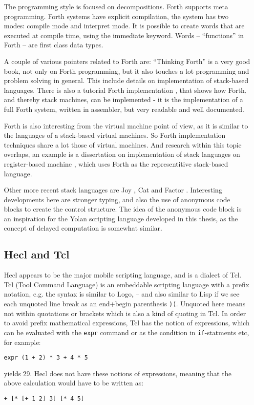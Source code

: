 \documentclass[11pt]{report}
\begin{document}
The programming style is focused on decompositions. Forth supports meta programming.
Forth systems have explicit compilation, the system has two modes: compile mode and interpret mode. 
It is possible to create words that are executed at compile time, using the immediate keyword.
Words -- ``functions'' in Forth -- are first class data types.

A couple of various pointers related to Forth are: 
``Thinking Forth'' is a very good book, not only on Forth programming, but it also touches a lot programming and problem solving in general. This include details on implementation of stack-based languages.
There is also a tutorial Forth implementation \cite{jonesforth}, that shows how Forth, and thereby stack machines, can be implemented - it is the implementation of a full Forth system, written in assembler, but very readable and well documented.

Forth is also interesting from the virtual machine point of view, as it is similar to the languages of a stack-based virtual machines. So Forth implementation techniques share a lot those of virtual machines. And research within this topic overlaps, an example is a dissertation on implementation of stack languages on register-based machine \cite{ertl-dissertation}, which uses Forth as the representitive stack-based language.

Other more recent stack languages are Joy \cite{joy-language}, Cat \cite{cat-language} and Factor \cite{factor-language}.
Interesting developments here are stronger typing, and also the use of anonymous code blocks to create the control structure.
The idea of the anonymous code block is an inspiration for the Yolan scripting language developed in this thesis, as the concept of delayed computation is somewhat similar.


\subsection{Hecl and Tcl}
Hecl appears to be the major mobile scripting language, and is a dialect of Tcl. 
Tcl (Tool Command Language) is an embeddable scripting language \cite{tclbook} with a prefix notation, e.g. the syntax is similar to Logo, -- and also similar to Lisp if we see each unquoted line break as an end+begin parenthesis \verb|)(|. Unquoted here means not within quotations or brackets which is also a kind of quoting in Tcl.
In order to avoid prefix mathematical expressions, Tcl has the notion of expressions, which can be evaluated with the \verb|expr| command or as the condition in \verb|if|-statments etc, for example:
\begin{verbatim}
expr (1 + 2) * 3 + 4 * 5
\end{verbatim}
yields 29. Hecl does not have these notions of expressions, meaning that the above calculation would have to be written as:
\begin{verbatim}
+ [* [+ 1 2] 3] [* 4 5]
\end{verbatim}
\end{document}
